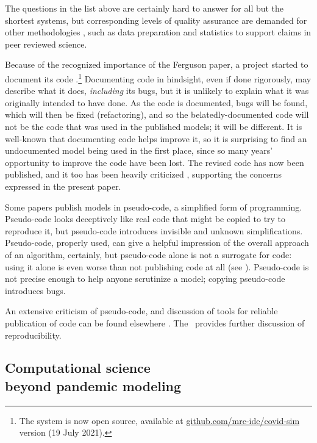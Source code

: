 \documentclass{comjnl}
\begin{document}
The questions in the list above are certainly hard to answer for all but the shortest systems, but corresponding levels of quality assurance are demanded for other methodologies \cite{notebooks,popper-conjectures-refutations,tripod,prisma,nih-policy,nih-nature}, such as data preparation and statistics to support claims in peer reviewed science. 

Because of the recognized importance of the Ferguson paper, a project started to document its code  \cite{refactoring}.\footnote{The system is now open source, available at \url{github.com/mrc-ide/covid-sim} version (19 July 2021).} Documenting code in hindsight, even if done rigorously, may describe what it does, \emph{including\/} its bugs, but it is unlikely to explain what it was originally intended to have done. As the code is documented, bugs will be found, which will then be fixed (refactoring), and so the belatedly-documented code will not be the code that was used in the published models; it will be different. It is well-known that documenting code helps improve it, so it is surprising to find an undocumented model being used in the first place, since so many years' opportunity to improve the code have been lost. The revised code has now been published, and it too has been heavily criticized , supporting the concerns expressed in the present paper.

Some papers  publish models in pseudo-code, a simplified form of programming. Pseudo-code looks deceptively like real code that might be copied to try to reproduce it, but pseudo-code introduces invisible and unknown simplifications. Pseudo-code, properly used, can give a helpful impression of the overall approach of an algorithm, certainly, but pseudo-code alone is not a surrogate for code: using it alone is even worse than not publishing code at all (see \cite{chinese}). Pseudo-code is not precise enough to help anyone scrutinize a model; copying pseudo-code introduces bugs. 

An extensive criticism of pseudo-code, and discussion of tools for reliable publication of code can be found elsewhere \cite{relit}. The \supplement\ provides further discussion of reproducibility.

\subsection{Computational science \\ beyond pandemic modeling}
\label{section-science-beyond-pandemic-modeling}
\end{document}
